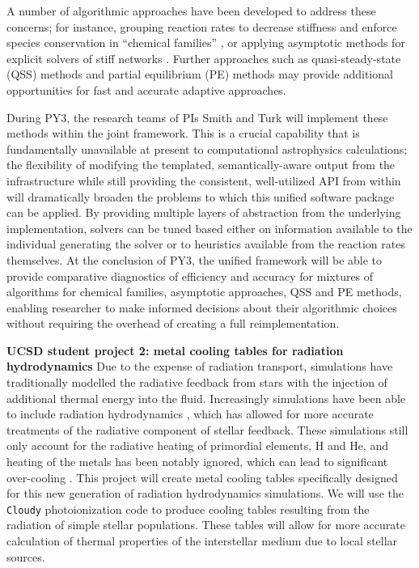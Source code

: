 A number of algorithmic approaches have been developed to address these concerns;
for instance, grouping reaction rates to decrease stiffness and enforce species
conservation in ``chemical families''
\citep{doi:10.1002/kin.550100907, SANDU19973151}, or applying 
asymptotic methods for explicit solvers of stiff networks
\citep{1749-4699-6-1-015001}.  Further approaches such as 
quasi-steady-state (QSS) methods \citep{1749-4699-6-1-015002} and 
partial equilibrium (PE) methods \citep{1749-4699-6-1-015003} may provide
additional opportunities for fast and accurate adaptive approaches.

During PY3, the research teams of PIs Smith and Turk will implement these
methods within the joint framework.  This is a crucial capability that is
fundamentally unavailable at present to computational astrophysics
calculations; the flexibility of modifying the templated, semantically-aware
output from the \dengo{} infrastructure while still providing the consistent,
well-utilized API from within \grackle{} will dramatically broaden the problems
to which this unified software package can be applied.  By providing multiple
layers of abstraction from the underlying implementation, solvers can be tuned
based either on information available to the individual generating the solver
or to heuristics available from the reaction rates themselves.  At the
conclusion of PY3, the unified framework will be able to provide comparative
diagnostics of efficiency and accuracy for mixtures of algorithms for chemical
families, asymptotic approaches, QSS and PE methods, enabling researcher to
make informed decisions about their algorithmic choices without requiring the
overhead of creating a full reimplementation.

\noindent \textbf{UCSD student project 2: metal cooling
  tables for radiation hydrodynamics}
Due to the expense of radiation transport, simulations have
traditionally modelled the radiative feedback from stars with the
injection of additional thermal energy into the fluid.  Increasingly
simulations have been able to include radiation
hydrodynamics \citep{2012MNRAS.427..311W, Xu_2013, Wise_2014,
2015ApJ...807L..12O}, which has allowed for more accurate treatments of the
radiative component of stellar feedback.  These simulations
still only account for the radiative heating of primordial elements, H
and He, and heating of the metals has been notably ignored, which can
lead to significant over-cooling \citep{2011MNRAS.413..190T,
  2012MNRAS.427..311W}.  This project will create
metal cooling tables specifically designed for this new generation of
radiation hydrodynamics simulations.  We will use the \texttt{Cloudy}
photoionization code to produce cooling tables resulting from the
radiation of simple stellar populations.  These tables will allow for
more accurate calculation of thermal properties of the interstellar
medium due to local stellar sources.

